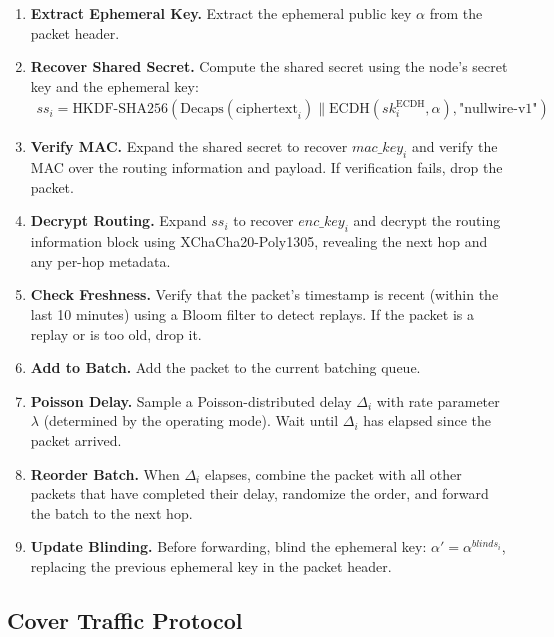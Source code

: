 \documentclass[11pt]{article}
\theoremstyle{definition}
\theoremstyle{remark}
\begin{document}
\begin{enumerate}
    \item \textbf{Extract Ephemeral Key.} Extract the ephemeral public key $\alpha$ from the packet header.

    \item \textbf{Recover Shared Secret.} Compute the shared secret using the node's secret key and the ephemeral key:
    \begin{align*}
        ss_i = \text{HKDF-SHA256}(\text{Decaps}(\text{ciphertext}_i) \| \text{ECDH}(sk_i^{\text{ECDH}}, \alpha), \text{"nullwire-v1"})
    \end{align*}

    \item \textbf{Verify MAC.} Expand the shared secret to recover $mac\_key_i$ and verify the MAC over the routing information and payload. If verification fails, drop the packet.

    \item \textbf{Decrypt Routing.} Expand $ss_i$ to recover $enc\_key_i$ and decrypt the routing information block using XChaCha20-Poly1305, revealing the next hop and any per-hop metadata.

    \item \textbf{Check Freshness.} Verify that the packet's timestamp is recent (within the last 10 minutes) using a Bloom filter to detect replays. If the packet is a replay or is too old, drop it.

    \item \textbf{Add to Batch.} Add the packet to the current batching queue.

    \item \textbf{Poisson Delay.} Sample a Poisson-distributed delay $\Delta_i$ with rate parameter $\lambda$ (determined by the operating mode). Wait until $\Delta_i$ has elapsed since the packet arrived.

    \item \textbf{Reorder Batch.} When $\Delta_i$ elapses, combine the packet with all other packets that have completed their delay, randomize the order, and forward the batch to the next hop.

    \item \textbf{Update Blinding.} Before forwarding, blind the ephemeral key: $\alpha' = \alpha^{blinds_i}$, replacing the previous ephemeral key in the packet header.
\end{enumerate}

\subsection{Cover Traffic Protocol}
\label{subsec:cover-traffic}
\end{document}

